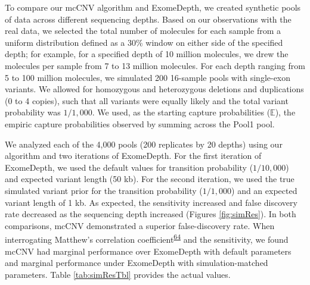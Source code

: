 \documentclass[11pt,letterpaper]{book}
\begin{document}
To compare our mcCNV algorithm and ExomeDepth, we created synthetic pools of data across different sequencing depths.
Based on our observations with the real data, we selected the total number of molecules for each sample from a uniform distribution defined as a 30\% window on either side of the specified depth; for example, for a specified depth of 10 million molecules, we drew the molecules per sample from 7 to 13 million molecules.
For each depth ranging from 5 to 100 million molecules, we simulated 200 16-sample pools with single-exon variants.
We allowed for homozygous and heterozygous deletions and duplications (0 to 4 copies), such that all variants were equally likely and the total variant probability was \(1/1,000\).
We used, as the starting capture probabilities (\(\mathbb{E}\)), the empiric capture probabilities observed by summing across the Pool1 pool.

We analyzed each of the 4,000 pools (200 replicates by 20 depths) using our algorithm and two iterations of ExomeDepth.
For the first iteration of ExomeDepth, we used the default values for transition probability (\(1/10,000\)) and expected variant length (50 kb).
For the second iteration, we used the true simulated variant prior for the transition probability (\(1/1,000\)) and an expected variant length of 1 kb.
As expected, the sensitivity increased and false discovery rate decreased as the sequencing depth increased (Figures \ref{fig:simRes}).
In both comparisons, mcCNV demonstrated a superior false-discovery rate.
When interrogating Matthew's correlation coefficient\textsuperscript{\protect\hyperlink{ref-matthews:1975aa}{64}} and the sensitivity, we found mcCNV had marginal performance over ExomeDepth with default parameters and marginal performance under ExomeDepth with simulation-matched parameters. Table \ref{tab:simResTbl} provides the actual values.
\end{document}
